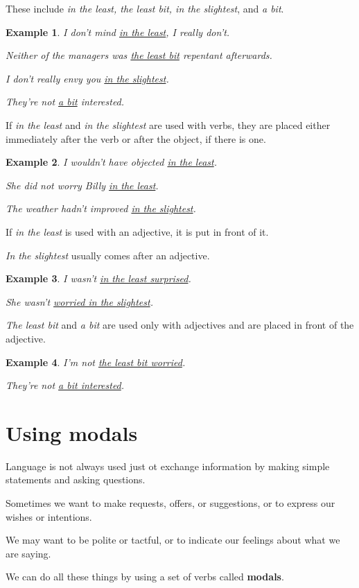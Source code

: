 \documentclass[oneside]{book}
\numberwithin{equation}{section}
\newtheorem{example}{Example}[section]
\begin{document}
These include \textit{in the least, the least bit, in the slightest}, and \textit{a bit}.
\begin{example}
    I don't mind \underline{in the least}, I really don't.
    
    Neither of the managers was \underline{the least bit} repentant afterwards.
    
    I don't really envy you \underline{in the slightest}.
    
    They're not \underline{a bit} interested.
\end{example}
If \textit{in the least} and \textit{in the slightest} are used with verbs, they are placed either immediately after the verb or after the object, if there is one.
\begin{example}
    I wouldn't have objected \underline{in the least}.
    
    She did not worry Billy \underline{in the least}.
    
    The weather hadn't improved \underline{in the slightest}.
\end{example}
If \textit{in the least} is used with an adjective, it is put in front of it.

\textit{In the slightest} usually comes after an adjective.
\begin{example}
    I wasn't \underline{in the least surprised}.
    
    She wasn't \underline{worried in the slightest}.
\end{example}
\textit{The least bit} and \textit{a bit} are used only with adjectives and are placed in front of the adjective.
\begin{example}
    I'm not \underline{the least bit worried}.
    
    They're not \underline{a bit interested}.
\end{example}

\section{Using modals}
\noindent{} Language is not always used just ot exchange information by making simple statements and asking questions.

Sometimes we want to make requests, offers, or suggestions, or to express our wishes or intentions.

We may want to be polite or tactful, or to indicate our feelings about what we are saying.

%
We can do all these things by using a set of verbs called \textbf{modals}.
\end{document}
